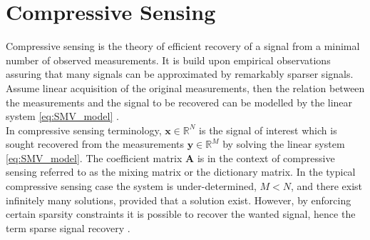 \section{Compressive Sensing}\label{sec:CS}
Compressive sensing is the theory of efficient recovery of a signal from a minimal number of observed measurements. 
It is build upon empirical observations assuring that many signals can be approximated by remarkably sparser signals.   
Assume linear acquisition of the original measurements, then the relation between the measurements and the signal to be recovered can be modelled by the linear system \eqref{eq:SMV_model} \cite{FR}.  
\\ 
In compressive sensing terminology, $\mathbf{x} \in \mathbb{R}^N$ is the signal of interest which is sought recovered from the measurements $\mathbf{y} \in \mathbb{R}^M$ by solving the linear system \eqref{eq:SMV_model}. 
The coefficient matrix $\mathbf{A}$ is in the context of compressive sensing referred to as the mixing matrix or the dictionary matrix.  
In the typical compressive sensing case the system is under-determined, $M < N$,  and there exist infinitely many solutions, provided that a solution exist.
However, by enforcing certain sparsity constraints it is possible to recover the wanted signal, hence the term sparse signal recovery \cite{FR}.
 
